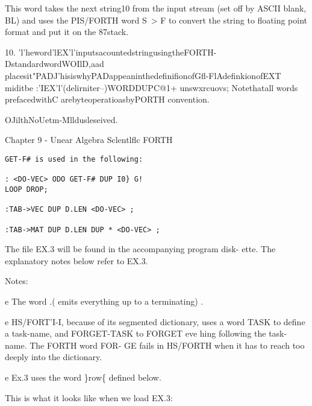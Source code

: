 This word takes the next string10 from the input stream (set off
by ASCII blank, BL) and uses the PIS/FORTH word S~> F to
convert the string to floating point format and put it on the
87stack.

 

10. 'l'heword'lEX'l'inputsacountedstringusingtheFORTH-DstandardwordWOIlD,aad
placesit"PADJ'hisiswhyPADappeaninthedefinifionofGfl-FlAdefinkionofEXT
miditbe :'IEX'l'(delirniter--)WORDDUPC@1+ unswxrcuovs; Notethatall
words prefacedwithC arebyteoperatioasbyPORTH convention.

OJilthNoUetm-Mlldusleseived.

Chapter 9 - Unear Algebra Sclentlflc FORTH

\begin{verbatim}
GET-F# is used in the following:

: <DO-VEC> ODO GET-F# DUP I0} G!
LOOP DROP;

:TAB->VEC DUP D.LEN <DO-VEC> ;

:TAB->MAT DUP D.LEN DUP * <DO-VEC> ;
\end{verbatim}

The file EX.3 will be found in the accompanying program disk-
ette. The explanatory notes below refer to EX.3.

Notes:

e The word .( emits everything up to a terminating) .

e HS/FORT'I-I, because of its segmented dictionary, uses a word
TASK to define a task-name, and FORGET-TASK to FORGET
eve hing following the task-name. The FORTH word FOR-
GE fails in HS/FORTH when it has to reach too deeply into
the dictionary.

e Ex.3 uses the word \}row\{ defined below.

This is what it looks like when we load EX.3:

